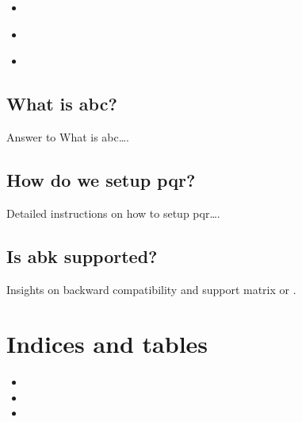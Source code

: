 \documentclass[letterpaper,10pt,english]{sphinxmanual}
\begin{document}
\begin{sphinxShadowBox}
\begin{itemize}
\item {} 
\label{\detokenize{faq:id1}}{\hyperref[\detokenize{faq:what-is-abc}]{}}

\item {} 
\label{\detokenize{faq:id2}}{\hyperref[\detokenize{faq:how-do-we-setup-pqr}]{}}

\item {} 
\label{\detokenize{faq:id3}}{\hyperref[\detokenize{faq:is-abk-supported}]{}}

\end{itemize}
\end{sphinxShadowBox}


\section{What is abc?}
\label{\detokenize{faq:what-is-abc}}
Answer to What is abc….


\section{How do we setup pqr?}
\label{\detokenize{faq:how-do-we-setup-pqr}}
Detailed instructions on how to setup pqr….


\section{Is abk supported?}
\label{\detokenize{faq:is-abk-supported}}
Insights on backward compatibility and support matrix or {\hyperref[\detokenize{relnotes:doc-relnotes}]{}}.


\chapter{Indices and tables}
\label{\detokenize{index:indices-and-tables}}\begin{itemize}
\item {} 

\item {} 

\item {} 

\end{itemize}



\renewcommand{\indexname}{Index}
\printindex
\end{document}
